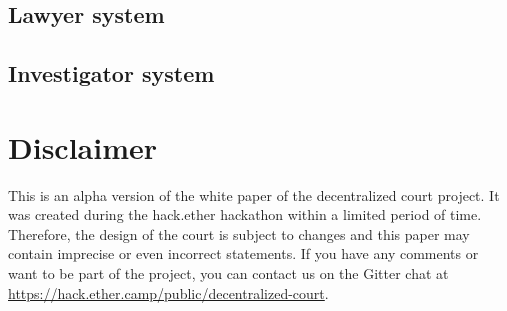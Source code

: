 \documentclass[12 pt]{article}
\begin{document}
\subsection{Lawyer system}

\subsection{Investigator system}

\section{Disclaimer}
This is an alpha version of the white paper of the decentralized court project. It was created during the hack.ether hackathon within a limited period of time. Therefore, the design of the court is subject to changes and this paper may contain imprecise or even incorrect statements. If you have any comments or want to be part of the project, you can contact us on the Gitter chat at \url{https://hack.ether.camp/public/decentralized-court}.





\nocite{*}
{}

\end{document}
